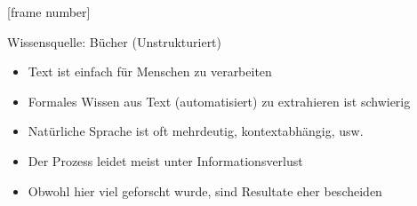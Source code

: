 \documentclass{beamer}
\begin{document}
{
	[frame number]
	\begin{frame}[plain]

	\end{frame}
}


\begin{frame}{Wissensquelle: Bücher (Unstrukturiert)}
	
	\begin{itemize}
		\item Text ist einfach für Menschen zu verarbeiten
		\item Formales Wissen aus Text (automatisiert) zu extrahieren ist schwierig
		\item Natürliche Sprache ist oft mehrdeutig, kontextabhängig, usw.
		\item Der Prozess leidet meist unter Informationsverlust
		\item Obwohl hier viel geforscht wurde, sind Resultate eher bescheiden
	\end{itemize}
	
\end{frame}
\end{document}
